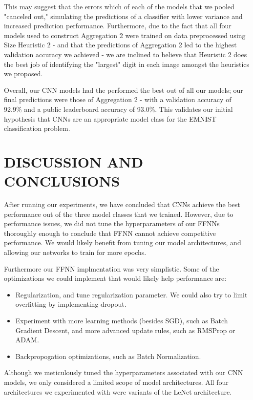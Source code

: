 \documentclass[letterpaper, 10 pt, conference]{ieeeconf}  %
\begin{document}
This may suggest that the errors which of each of the models that we pooled "canceled out," simulating the predictions of a classifier with lower variance and increased prediction performance. Furthermore, due to the fact that all four models used to construct Aggregation 2 were trained on data preprocessed using Size Heuristic 2 - and that the predictions of Aggregation 2 led to the highest validation accuracy we achieved - we are inclined to believe that Heuristic 2 does the best job of identifying the "largest" digit in each image amongst the heuristics we proposed. 

Overall, our CNN models had the performed the best out of all our models; our final predictions were those of Aggregation 2 - with a validation accuracy of 92.9\% and a public leaderboard accuracy of 93.0\%. This validates our initial hypothesis that CNNs are an appropriate model class for the EMNIST classification problem.

\section{DISCUSSION AND CONCLUSIONS}

After running our experiments, we have concluded that CNNs achieve the best performance out of the three model classes that we trained. However, due to performance issues, we did not tune the hyperparameters of our FFNNs thoroughly enough to conclude that FFNN cannot achieve competitive performance. We would likely benefit from tuning our model architectures, and allowing our networks to train for more epochs. 

Furthermore our FFNN implmentation was very simplistic. Some of the optimizations we could implement that would likely help performance are:

\begin{itemize}
\item Regularization, and tune regularization parameter. We could also try to limit overfitting by implementing dropout.
\item Experiment with more learning methods (besides SGD), such as Batch Gradient Descent, and more advanced update rules, such as RMSProp or ADAM.
\item Backpropogation optimizations, such as Batch Normalization.  
\end{itemize}

Although we meticulously tuned the hyperparameters associated with our CNN models, we only considered a limited scope of model architectures. All four architectures we experimented with were variants of the LeNet architecture. 
\end{document}
